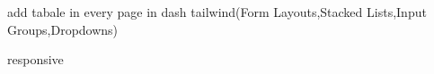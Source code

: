 add tabale in every page in dash
tailwind(Form Layouts,Stacked Lists,Input Groups,Dropdowns)




responsive

